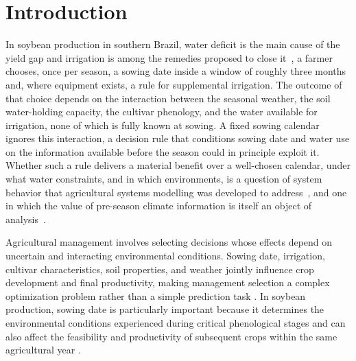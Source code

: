 \documentclass[times,final,authoryear]{elsarticle}
\begin{document}
\section{Introduction}
\label{introduction}
In soybean production in southern Brazil, water deficit is the main cause of the yield gap and irrigation is among the remedies proposed to close it~\citep{sentelhas2015yieldgap}, a farmer chooses, once per season, a sowing date inside a window of roughly three months and, where equipment exists, a rule for supplemental irrigation. The outcome of that choice depends on the interaction between the seasonal weather, the soil water-holding capacity, the cultivar phenology, and the water available for irrigation, none of which is fully known at sowing. A fixed sowing calendar ignores this interaction, a decision rule that conditions sowing date and water use on the information available before the season could in principle exploit it. Whether such a rule delivers a material benefit over a well-chosen calendar, under what water constraints, and in which environments, is a question of system behavior that agricultural systems modelling was developed to address~\citep{jones2017history}, and one in which the value of pre-season climate information is itself an object of analysis~\citep{hansen2002climate}.

Agricultural management involves selecting decisions whose effects depend on uncertain and interacting environmental conditions. Sowing date, irrigation, cultivar characteristics, soil properties, and weather jointly influence crop development and final productivity, making management selection a complex optimization problem rather than a simple prediction task \citep{Xiao2024, Akhavizadegan2022}. In soybean production, sowing date is particularly important because it determines the environmental conditions experienced during critical phenological stages and can also affect the feasibility and productivity of subsequent crops within the same agricultural year \citep{debangshi2025plantingdates, bigolin2025latesoybean, zhang2021modissoybean}. 
\end{document}
